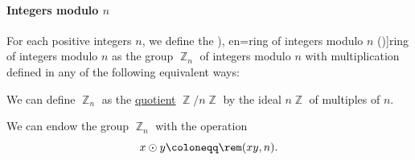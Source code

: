 \paragraph{Integers modulo \( n \)}

\begin{definition}\label{def:ring_of_integers_modulo}
  For each positive integers \( n \), we define the \term[ru=кольцо вычетов по модулю (\cite[30]{Винберг2014КурсАлгебры}), en=ring of integers modulo \( n \) (\cite[112]{Bourbaki1998Algebra1to3})]{ring of integers modulo} \( n \) as the group \hyperref[def:group_of_integers_modulo]{\( \BbbZ_n \)} of integers modulo \( n \) with multiplication defined in any of the following equivalent ways:

  \begin{thmenum}
     We can define \( \BbbZ_n \) as the \hyperref[def:ring/quotient]{quotient} \( \BbbZ / n \BbbZ \) by the ideal \( n \BbbZ \) of multiples of \( n \).

    \mimprovised We can endow the group \( \BbbZ_n \) with the operation
    \begin{equation*}
      x \odot y \coloneqq \rem(xy, n).
    \end{equation*}
  \end{thmenum}
\end{definition}
